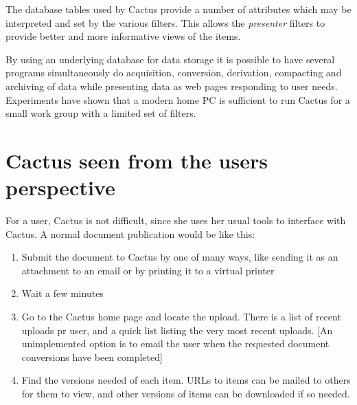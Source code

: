 The database tables used by Cactus provide a number of
attributes which may be interpreted and set by the various
filters.  This allows the \textit{presenter} filters to
provide better and more informative views of the items.

By using an underlying database for data storage it is
possible to have several programs simultaneously do
acquisition, conversion, derivation, compacting and
archiving of data while presenting data as web pages
responding to user needs. Experiments have shown that a
modern home PC is sufficient to run Cactus for a small work
group with a limited set of filters.




\section{Cactus seen from the users perspective}
\label{sec:cactus-seen-from-the-users-perspective}


For a user, Cactus is not difficult, since she uses her
usual tools to interface with Cactus. A normal document
publication would be like this:


\begin{enumerate}
\item Submit the document to Cactus by one of many ways,
  like sending it as an attachment to an email or by
  printing it to a virtual printer
  
\item Wait a few minutes
  
\item Go to the Cactus home page and locate the upload.
  There is a list of recent uploads pr user, and a quick
  list listing the very most recent uploads.  [An
  unimplemented option is to email the user when the
  requested document conversions have been completed]
  
\item Find the versions needed of each item.  URLs to items
  can be mailed to others for them to view, and other
  versions of items can be downloaded if so needed.
\end{enumerate}

